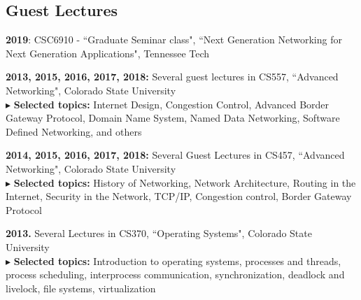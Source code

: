 
\subsection{Guest Lectures}
\begin{cvlist}      

    \item \textbf{2019}: CSC6910 - ``Graduate Seminar class", ``Next Generation Networking for Next Generation Applications", Tennessee Tech
    \item \textbf{2013, 2015, 2016, 2017, 2018: } Several guest lectures in CS557, ``Advanced Networking",  Colorado State University\\
    $\blacktriangleright$ \textbf{Selected topics:} Internet Design, Congestion Control, Advanced Border Gateway Protocol, Domain Name System, Named Data Networking, Software Defined Networking, and others\\
    
    
    \item \textbf{2014, 2015, 2016, 2017, 2018:} Several Guest Lectures in  CS457, ``Advanced Networking",  Colorado State University \\
    $\blacktriangleright$ \textbf{Selected topics:} History of Networking,  Network Architecture,   Routing in the Internet, Security in the Network,  TCP/IP, Congestion control, Border Gateway Protocol\\
    
    \item \textbf{2013.} Several Lectures in CS370, ``Operating Systems", Colorado State University\\
    $\blacktriangleright$ \textbf{Selected topics:} Introduction to operating systems, processes and threads, process scheduling, interprocess communication, synchronization,  deadlock and livelock, file systems, virtualization\\
    

\end{cvlist}

